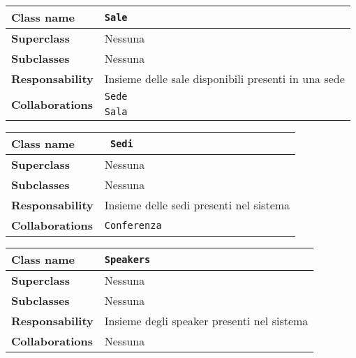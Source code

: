 \begin{table}[h!]
	\begin{tabular}{|l|l|}
		\hline 
		\textbf{Class name} & \texttt{Sale}
		\\ \hline
		\textbf{Superclass} & Nessuna
		\\ \hline
		\multirow{1}{*}{\textbf{Subclasses}} & Nessuna
		\\ \hline
		\textbf{Responsability} & Insieme delle sale disponibili presenti in una sede
		\\ \hline
		\multirow{2}{*}{\textbf{Collaborations}} & \texttt{Sede} \\ & \texttt{Sala}
		\\ \hline
	\end{tabular}
\end{table}

\begin{table}[h!]
	\begin{tabular}{|l|l|}
		\hline 
		\textbf{Class name} &\texttt{ Sedi}
		\\ \hline
		\textbf{Superclass} & Nessuna
		\\ \hline
		\multirow{1}{*}{\textbf{Subclasses}} & Nessuna
		\\ \hline
		\textbf{Responsability} & Insieme delle sedi presenti nel sistema
		\\ \hline
		\multirow{1}{*}{\textbf{Collaborations}} & \texttt{Conferenza}
		\\ \hline
	\end{tabular}
\end{table}

\begin{table}[h!]
	\begin{tabular}{|l|l|}
		\hline 
		\textbf{Class name} & \texttt{Speakers}
		\\ \hline
		\textbf{Superclass} & Nessuna
		\\ \hline
		\multirow{1}{*}{\textbf{Subclasses}} & Nessuna
		\\ \hline
		\textbf{Responsability} & Insieme degli speaker presenti nel sistema
		\\ \hline
		\multirow{1}{*}{\textbf{Collaborations}} & Nessuna
		\\ \hline
	\end{tabular}
\end{table}

